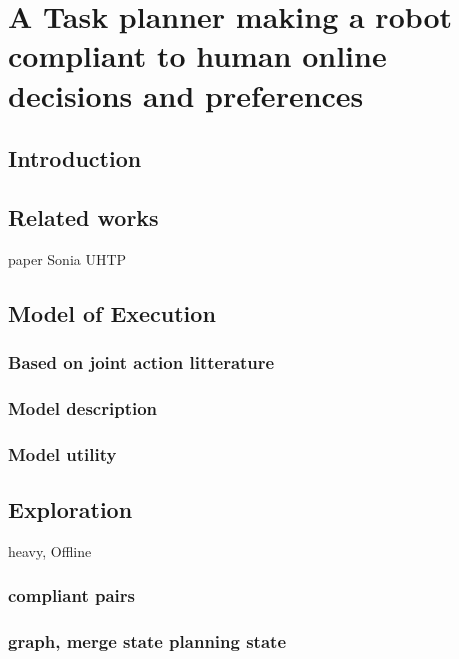 \ifdefined{}
\else
\setcounter{chapter}{3} %
\dominitoc
\faketableofcontents
\fi

\chapter{A Task planner making a robot compliant to human online decisions and preferences}
\label{chap:4}
\minitoc


\section{Introduction}

\section{Related works}
paper Sonia UHTP

\section{Model of Execution}

\subsection{Based on joint action litterature}

\subsection{Model description}

\subsection{Model utility}

\section{Exploration}

heavy, Offline

\subsection{compliant pairs}
\subsection{graph, merge state planning state}


